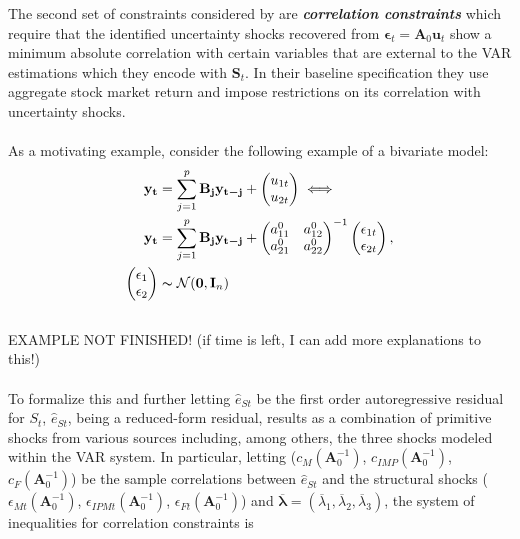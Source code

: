 \documentclass[a4paper,11pt,listof=nochaptergap,oneside,pointednumbers,bibtotoc,bigheadings,liststotoc]{scrbook}
\theoremstyle{mysatz}
\theoremstyle{mydefinition}
\theoremstyle{mybemerkung}
\newcommand{\vect}[1]{\boldsymbol{\mathbf{#1}}}
\begin{document}
The second set of constraints considered by \citet{ludvigsonetal:18} are \textbf{\textit{correlation constraints}} which require that the identified uncertainty shocks recovered from $\vect{\epsilon}_t = \vect{A}_0\vect{u}_t$ show a minimum absolute correlation with certain variables that are external to the VAR estimations which they encode with $\vect{S}_t$. In their baseline specification they use aggregate stock market return and impose restrictions on its correlation with uncertainty shocks. \\
\\
As a motivating example, \citet{ludvigsonetal:17} consider the following example of a bivariate model:
\begin{equation} \label{eq:svar_ludvi12_a}
\begin{split}
	\vect{y_t} & = \sum_{j=1}^{p} \vect{B_j}\vect{y_{t-j}} + 
		\begin{pmatrix}
			u_{1t} \\
			u_{2t}
		\end{pmatrix} \iff \\
\vect{y_t} & = \sum_{j=1}^{p} \vect{B_j}\vect{y_{t-j}} + 	
					\begin{pmatrix}
    			a_{11}^0 &  a_{12}^0 \\
			a_{21}^0 &  a_{22}^0
 			\end{pmatrix}^{-1}
		\begin{pmatrix}
			\epsilon_{1t} \\
			\epsilon_{2t}
		\end{pmatrix},\\
		\begin{pmatrix}
			\epsilon_1 \\
			\epsilon_2
		\end{pmatrix} & \thicksim \mathcal{N}(\vect{0}, \vect{I}_n)
\end{split}								
\end{equation}
\\
EXAMPLE NOT FINISHED! (if time is left, I can add more explanations to this!)
\\
\\
To formalize this and further letting $\hat{e}_{St}$ be the first order autoregressive residual for $S_t$, $\hat{e}_{St}$, being a reduced-form residual, results as a combination of primitive shocks from various sources including, among others, the three shocks modeled within the VAR system. In particular, letting ($c_M(\vect{A}_0^{-1})$, $c_{IMP}(\vect{A}_0^{-1})$, $c_{F}(\vect{A}_0^{-1})$) be the sample correlations between $\hat{e}_{St}$ and the structural shocks ($\epsilon_{Mt}(\vect{A}_0^{-1})$, $\epsilon_{IPMt}(\vect{A}_0^{-1})$, $\epsilon_{Ft}(\vect{A}_0^{-1})$) and $\overline{\vect{\lambda}} = (\overline{\lambda}_1, \overline{\lambda}_2, \overline{\lambda}_3)$, the system of inequalities for correlation constraints is
\end{document}
